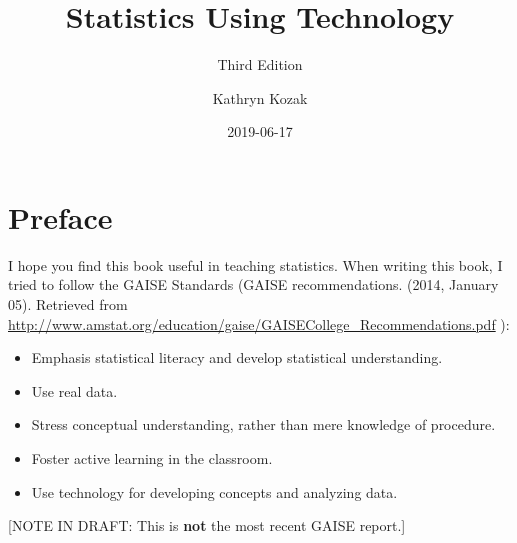 \documentclass[]{book}
\title{Statistics Using Technology}
\subtitle{Third Edition}
\author{Kathryn Kozak}
\date{2019-06-17}
\providecommand{\tightlist}{%
  \setlength{\itemsep}{0pt}\setlength{\parskip}{0pt}}
\begin{document}
\maketitle

{
\setcounter{tocdepth}{1}
\tableofcontents
}
\hypertarget{preface}{%
\chapter*{Preface}\label{preface}}

I hope you find this book useful in teaching statistics. When writing this book, I tried to follow the GAISE Standards (GAISE recommendations. (2014, January 05). Retrieved from \url{http://www.amstat.org/education/gaise/GAISECollege_Recommendations.pdf}
):

\begin{itemize}
\tightlist
\item
  Emphasis statistical literacy and develop statistical understanding.
\item
  Use real data.
\item
  Stress conceptual understanding, rather than mere knowledge of procedure.
\item
  Foster active learning in the classroom.
\item
  Use technology for developing concepts and analyzing data.
\end{itemize}

{[}NOTE IN DRAFT: This is \textbf{not} the most recent GAISE report.{]}
\end{document}
